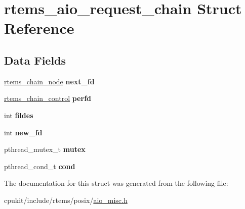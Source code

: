 \hypertarget{structrtems__aio__request__chain}{}\section{rtems\+\_\+aio\+\_\+request\+\_\+chain Struct Reference}
\label{structrtems__aio__request__chain}
\subsection*{Data Fields}
\begin{DoxyCompactItemize}
\item 
\mbox{\label{structrtems__aio__request__chain_a2705a97e2a8f48501ab6a07e933aebfb}} 
\mbox{\hyperlink{structChain__Node__struct}{rtems\+\_\+chain\+\_\+node}} {\bfseries next\+\_\+fd}
\item 
\mbox{\label{structrtems__aio__request__chain_a0f06e06828868300abcf691359158c8e}} 
\mbox{\hyperlink{unionChain__Control}{rtems\+\_\+chain\+\_\+control}} {\bfseries perfd}
\item 
\mbox{\label{structrtems__aio__request__chain_aaecf395a2d69efe0796b1553a7666bdd}} 
int {\bfseries fildes}
\item 
\mbox{\label{structrtems__aio__request__chain_a978631a127132a40a3cdb079da67d87a}} 
int {\bfseries new\+\_\+fd}
\item 
\mbox{\label{structrtems__aio__request__chain_af87817d72b7dc2538be17b583dff9783}} 
pthread\+\_\+mutex\+\_\+t {\bfseries mutex}
\item 
\mbox{\label{structrtems__aio__request__chain_a0677fc48d2490854f52b5fbfba9331ae}} 
pthread\+\_\+cond\+\_\+t {\bfseries cond}
\end{DoxyCompactItemize}


The documentation for this struct was generated from the following file\+:\begin{DoxyCompactItemize}
\item 
cpukit/include/rtems/posix/\mbox{\hyperlink{aio__misc_8h}{aio\+\_\+misc.\+h}}\end{DoxyCompactItemize}
